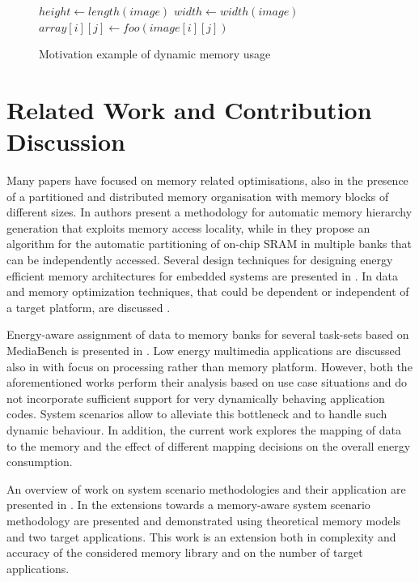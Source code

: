 \documentclass[a4paper,conference]{IEEEtran}
\begin{document}
\begin{figure}[!t]
\begin{algorithmic}
	\STATE $height \gets length(image)$
	\STATE $width \gets width(image)$
			\STATE $array[i][j] \gets foo(image[i][j])$
		\ENDFOR
	\ENDFOR
\ENDWHILE
\end{algorithmic}
\caption{Motivation example of dynamic memory usage}
\label{fig:motivation}
\end{figure}

\section{Related Work and Contribution Discussion}
\label{sec:related}

Many papers have focused on memory related optimisations, also in the presence of a partitioned and distributed memory organisation with memory blocks of different sizes. In \cite{Ben00b} authors present a methodology for automatic memory hierarchy generation that exploits memory access locality, while in \cite{Ben00c} they propose an algorithm for the automatic partitioning of on-chip SRAM in multiple banks that can be independently accessed. Several design techniques for designing energy efficient memory architectures for embedded systems are presented in \cite{Mac02}. In \cite{Pgk01} data and memory optimization techniques, that could be dependent or independent of a target platform, are discussed . 

Energy-aware assignment of data to memory banks for several task-sets based on MediaBench is presented in \cite{Mar03}. Low energy multimedia applications are discussed also in \cite{Chu02} with focus on processing rather than memory platform. However, both the aforementioned works perform their analysis based on use case situations and do not incorporate sufficient support for very dynamically behaving application codes. System scenarios allow to alleviate this bottleneck and to handle such dynamic behaviour. In addition, the current work explores the mapping of data to the memory and the effect of different mapping decisions on the overall energy consumption.

An overview of work on system scenario methodologies and their application are presented in \cite{Gheorghita2007}. In \cite{Fil12} the extensions towards a memory-aware system scenario methodology are presented and demonstrated using theoretical memory models and two target applications. This work is an extension both in complexity and accuracy of the considered memory library and on the number of target applications. 
\end{document}
